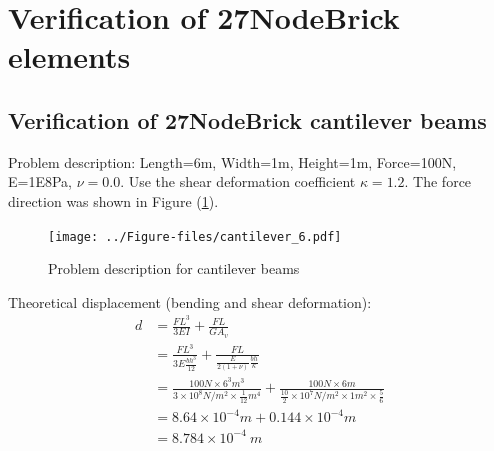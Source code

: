 \documentclass[fleqn,11pt]{article}
\begin{document}
\newpage

\section{Verification of 27NodeBrick elements}
\subsection{Verification of 27NodeBrick cantilever beams}






Problem description: Length=6m, Width=1m, Height=1m, Force=100N, E=1E8Pa, $\nu=0.0$. Use the shear deformation coefficient $\kappa=1.2$. The force direction was shown in Figure (\ref{fig Problem description for cantilever 27}). 

\begin{figure}[H]
  \centering
  \texttt{[image: ../Figure-files/cantilever\_6.pdf]}
  \caption{Problem description for cantilever beams}
  \label{fig Problem description for cantilever 27}
\end{figure}


Theoretical displacement (bending and shear deformation):
\begin{equation}
  \begin{aligned}
  d &=\frac{FL^3}{3EI}+\frac{FL}{GA_v} \\
  &= \frac{FL^3}{3E\frac{bh^3}{12}}+\frac{FL}{\frac{E}{2(1+\nu)} \frac{bh}{\kappa}} \\ 
    &= \frac{100 N \times 6^3 m^3}{3\times 10^8 N/m^2 \times \frac{1}{12} m^4}+ 
    \frac{100 N\times 6 m}{\frac{10}{2} \times 10^7 N/m^2\times 1 m^2 \times \frac{5}{6}} \\ 
    &=8.64\times 10^{-4} m + 0.144 \times 10^{-4} m   \\
   & =8.784\times 10^{-4} \ m
   \end{aligned}
\end{equation}
\end{document}
